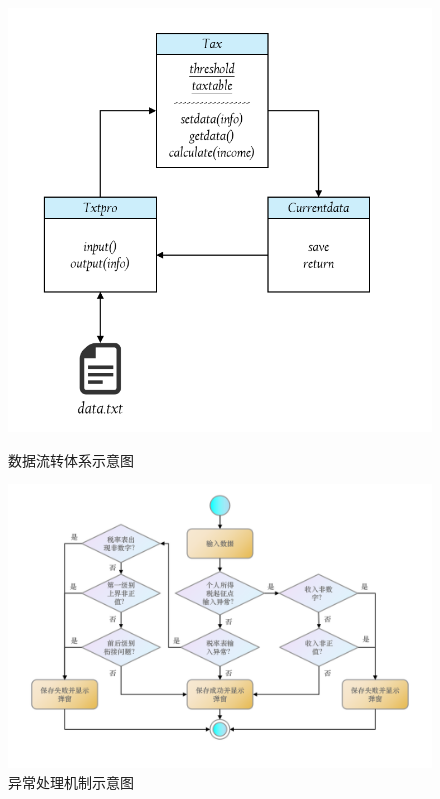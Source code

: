 \documentclass[a4paper, utf8]{ctexart}
\begin{document}
    \begin{figure}[htbp]
        \begin{minipage}{.35\linewidth}
            \centering
            \includegraphics[height=.22\textheight]{./figure/IOProcess.png}
            \caption{数据流转体系示意图}
        \end{minipage}
        \begin{minipage}{.65\linewidth}
            \centering
            \includegraphics[height=.2\textheight]{./figure/Exception.png}
            \vspace{.02\textheight}
            \caption{异常处理机制示意图}
        \end{minipage}
    \end{figure}
\end{document}

